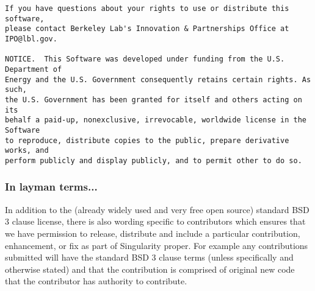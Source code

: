 \documentclass[a4paper]{article}
\begin{document}
\begin{lstlisting}[frame=single]
If you have questions about your rights to use or distribute this software,
please contact Berkeley Lab's Innovation & Partnerships Office at
IPO@lbl.gov.

NOTICE.  This Software was developed under funding from the U.S. Department of
Energy and the U.S. Government consequently retains certain rights. As such,
the U.S. Government has been granted for itself and others acting on its
behalf a paid-up, nonexclusive, irrevocable, worldwide license in the Software
to reproduce, distribute copies to the public, prepare derivative works, and
perform publicly and display publicly, and to permit other to do so. 
\end{lstlisting}

\subsubsection{In layman terms...}

In addition to the (already widely used and very free open source) standard BSD 3 clause license, there is also wording specific to contributors which ensures that we have permission to release, distribute and include a particular contribution, enhancement, or fix as part of Singularity proper. For example any contributions submitted will have the standard BSD 3 clause terms (unless specifically and otherwise stated) and that the contribution is comprised of original new code that the contributor has authority to contribute.
\end{document}
